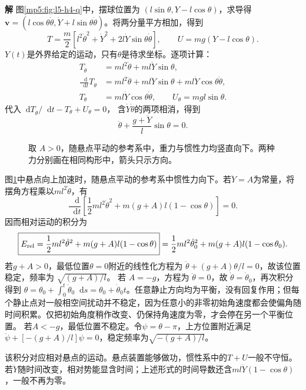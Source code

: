 \documentclass[11pt,openany,fontset=fandol]{ctexbook}
\theoremstyle{definition}\newtheorem{example}{例}[chapter]\newtheorem{exercise}{习题}[chapter]
\newcommand{\SolutionStart}{\par\medskip\ifdim\pagetotal>0pt\ifdim\dimexpr\pagegoal-\pagetotal\relax<3\baselineskip\newpage\fi\fi\noindent\textbf{解}\quad\ignorespaces}
\newenvironment{solution}{\SolutionStart}{\par\medskip}
\newcommand{\dd}{\mathop{}\!\mathrm d}\newcommand{\ee}{\mathrm e}\newcommand{\vct}[1]{\bm{#1}}
\begin{document}
\begin{solution}
图\ref{mp5:fig:l5-h4-q}中，摆球位置为 $(l\sin\theta,Y-l\cos\theta)$，求导得 $\vct v=(l\cos\theta\dot\theta,\dot Y+l\sin\theta\dot\theta)$。将两分量平方相加，得到
\[
 T=\frac m2[l^2\dot\theta^2+\dot Y^2
 +2l\dot Y\sin\theta\dot\theta],\qquad
 U=mg(Y-l\cos\theta).
\]
$Y(t)$是外界给定的运动，只有$\theta$是待求坐标。逐项计算：
\[
 \begin{aligned}
 T_{\dot\theta}&=ml^2\dot\theta+ml\dot Y\sin\theta,\\
 \frac{\dd}{\dd t}T_{\dot\theta}
 &=ml^2\ddot\theta+ml\ddot Y\sin\theta
 +ml\dot Y\cos\theta\dot\theta,\\
 T_\theta&=ml\dot Y\cos\theta\dot\theta,\qquad
 U_\theta=mgl\sin\theta.
 \end{aligned}
\]
代入$\dd T_{\dot\theta}/\dd t-T_\theta+U_\theta=0$，
含$\dot Y\dot\theta$的两项相消，得到
\[
 \boxed{\ddot\theta+\frac{g+\ddot Y}{l}\sin\theta=0}.
\]
\begin{figure}[H]\centering
{}
\caption{取 $A>0$，随悬点平动的参考系中，重力与惯性力均竖直向下。两种力分别画在相同构形中，箭头只示方向。}\label{mp5:fig:l5-h4-s}
\end{figure}
图\ref{mp5:fig:l5-h4-s}中悬点向上加速时，随悬点平动的参考系中惯性力向下。若$\ddot Y=A$为常量，将摆角方程乘以$ml^2\dot\theta$，有
\[
 \frac{\dd}{\dd t}\left[
 \frac12ml^2\dot\theta^2+m(g+A)l(1-\cos\theta)\right]=0.
\]
因而相对运动的积分为
\[
 \boxed{E_{\rm rel}=
 \frac12ml^2\dot\theta^2+m(g+A)l(1-\cos\theta)}
 =\frac12ml^2\dot\theta_0^2+m(g+A)l(1-\cos\theta_0).
\]
若$g+A>0$，最低位置$\theta=0$附近的线性化方程为
$\ddot\theta+(g+A)\theta/l=0$，故该位置稳定，频率为
$\sqrt{(g+A)/l}$。
若 $A=-g$，方程为 $\ddot\theta=0$，故 $\dot\theta=\dot\theta_0$，再次积分得到 $\theta=\theta_0+\int_0^t\dot\theta_0\dd s=\theta_0+\dot\theta_0t$。任意静止方向均为平衡，没有回复作用；但每个静止点对一般相空间扰动并不稳定，因为任意小的非零初始角速度都会使偏角随时间积累。仅把初始角度稍作改变、仍保持角速度为零，才会停在另一个平衡位置。
若$A<-g$，最低位置不稳定。令$\psi=\theta-\pi$，上方位置附近满足
$\ddot\psi+[-(g+A)/l]\psi=0$，稳定频率为$\sqrt{-(g+A)/l}$。

该积分对应相对悬点的运动。悬点装置能够做功，惯性系中的$T+U$一般不守恒。若$\ddot Y$随时间改变，相对势能显含时间；上述形式的时间导数还含$ml\dddot Y(1-\cos\theta)$，一般不再为零。
\end{solution}
\end{document}
